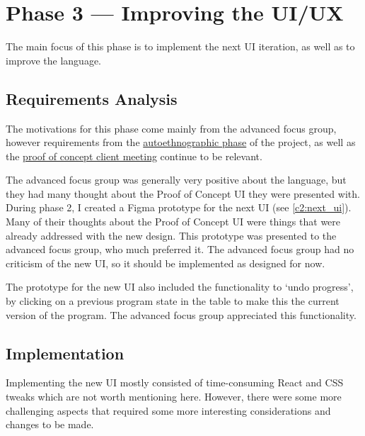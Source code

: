 \chapter{Phase 3 --- Improving the UI/UX}
The main focus of this phase is to implement the next UI iteration, as well as to improve the language. 

\section{Requirements Analysis}
The motivations for this phase come mainly from the advanced focus group, however requirements from the \hyperref[sec:c1_autoethnography]{autoethnographic phase} of the project, as well as the \hyperref[eval:c1]{proof of concept client meeting} continue to be relevant. 

The advanced focus group was generally very positive about the language, but they had many thought about the Proof of Concept UI they were presented with. During phase 2, I created a Figma prototype for the next UI (see \ref{c2:next_ui}). Many of their thoughts about the Proof of Concept UI were things that were already addressed with the new design. This prototype was presented to the advanced focus group, who much preferred it. The advanced focus group had no criticism of the new UI, so it should be implemented as designed for now. 

The prototype for the new UI also included the functionality to `undo progress', by clicking on a previous program state in the table to make this the current version of the program. The advanced focus group appreciated this functionality. 




\section{Implementation}
Implementing the new UI mostly consisted of time-consuming React and CSS tweaks which are not worth mentioning here. However, there were some more challenging aspects that required some more interesting considerations and changes to be made. 


